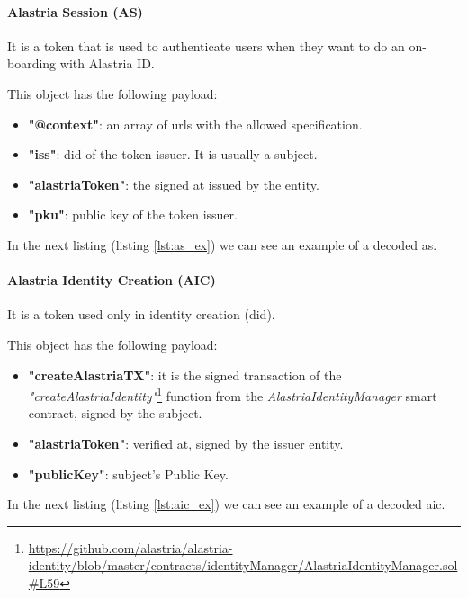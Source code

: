 \documentclass[a4paper, 12pt]{article} %
\begin{document}
            \paragraph{Alastria Session (AS)}
                It is a token that is used to authenticate users when they want to do an on-boarding with Alastria ID.
                
                This object has the following payload:
                \begin{itemize}
                    \item \textbf{"@context"}: an array of \acrshort{url}s with the allowed specification.
                    \item \textbf{"iss"}: \acrshort{did} of the token issuer. It is usually a subject.
                    \item \textbf{"alastriaToken"}: the signed \acrlong{at} issued by the entity.
                    \item \textbf{"pku"}: public key of the token issuer.
                \end{itemize}
                In the next listing (listing \ref{lst:as_ex}) we can see an example of a decoded \acrlong{as}.
                
                
            \paragraph{Alastria Identity Creation (AIC)}
                It is a token used only in identity creation (\acrshort{did}).
                
                This object has the following payload:
                \begin{itemize}
                    \item \textbf{"createAlastriaTX"}: it is the signed transaction of the \textit{"createAlastriaIdentity"}\footnote{\url{https://github.com/alastria/alastria-identity/blob/master/contracts/identityManager/AlastriaIdentityManager.sol\#L59}} function from the \textit{AlastriaIdentityManager} smart contract, signed by the subject.
                    \item \textbf{"alastriaToken"}: verified \acrlong{at}, signed by the issuer entity.
                    \item \textbf{"publicKey"}: subject's Public Key.
                \end{itemize}
                In the next listing (listing \ref{lst:aic_ex}) we can see an example of a decoded \acrlong{aic}.
                
                
\end{document}

